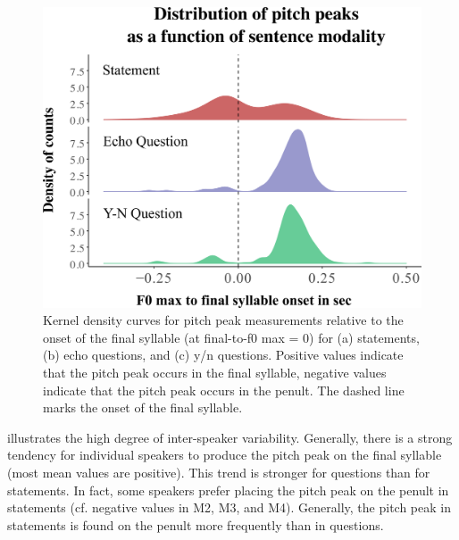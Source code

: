   \begin{figure}
  \centering 
   \includegraphics[width=1\textwidth]{figures/Figure_5_7.png}
  \caption{Kernel density curves for pitch peak measurements relative to the onset of the final syllable (at final-to-f0 max = 0) for (a) statements, (b) echo questions, and (c) y/n questions. Positive values indicate that the pitch peak occurs in the final syllable, negative values indicate that the pitch peak occurs in the penult. The dashed line marks the onset of the final syllable.}
   \label{fig:5.7}
   \end{figure}

 illustrates the high degree of inter-speaker variability. Generally, there is a strong tendency for individual speakers to produce the pitch peak on the final syllable (most mean values are positive). This trend is stronger for questions than for statements. In fact, some speakers prefer placing the pitch peak on the penult in statements (cf. negative values in M2, M3, and M4). Generally, the pitch peak in statements is found on the penult more frequently than in questions. 

